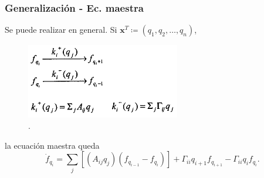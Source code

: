 \documentclass{beamer}
\begin{document}
\begin{frame}
\frametitle{Generalizaci\'on - Ec. maestra}
Se puede realizar en general. Si $\mathbf{x}^T \coloneqq (q_1,q_2,\dots,q_n)$, 
\begin{figure}[p]
    \centering
    \includegraphics[width=0.6\textwidth]{scheme2.png}\\
    \tiny \cite{thattai01}.
\end{figure}
la ecuaci\'on maestra queda
\begin{equation*}
\dot{f}_{q_i} = \sum_j \left[\left(A_{ij}q_j\right) \left(f_{q_{i-1}} - f_{q_i}\right)\right] + \Gamma_{ii}q_{i+1}f_{q_{i+1}} -\Gamma_{ii}q_if_{q_i}.
\end{equation*}
\end{frame}
\end{document}
